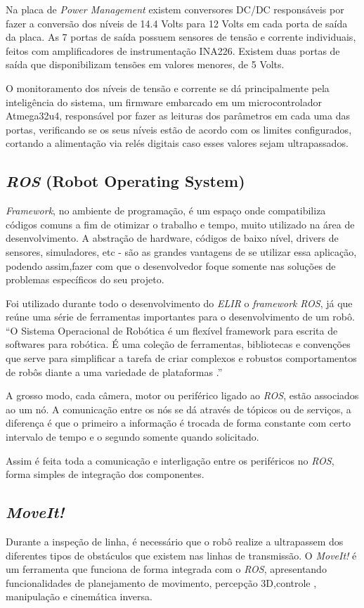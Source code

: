 Na placa de \textit{Power Management} existem conversores DC/DC responsáveis por fazer a conversão dos níveis de 14.4 Volts para 12 Volts em cada porta de saída da placa. As 7 portas de saída  possuem sensores de tensão e corrente individuais, feitos com amplificadores de instrumentação INA226. Existem duas portas de saída que disponibilizam tensões em valores menores, de 5 Volts. 

O monitoramento dos níveis de tensão e corrente se dá principalmente pela inteligência do sistema, um firmware embarcado em um microcontrolador Atmega32u4, responsável por fazer as leituras dos parâmetros em cada uma das portas, verificando se os seus níveis estão de acordo com os limites configurados, cortando a alimentação via relés digitais caso esses valores sejam ultrapassados.

\subsection{\textit{ROS} (Robot Operating System)}
\textit{Framework}, no ambiente de programação, é um espaço onde compatibiliza códigos comuns a fim de otimizar o trabalho e tempo, muito utilizado na área de desenvolvimento. A abstração de hardware, códigos de baixo nível, drivers de sensores, simuladores, etc - são as grandes vantagens de se utilizar essa aplicação, podendo assim,fazer com que o desenvolvedor foque somente nas soluções de problemas específicos do seu projeto.

Foi utilizado durante todo o desenvolvimento do \textit{ELIR} o \textit{framework} \textit{ROS}, já que reúne uma série de ferramentas importantes para o desenvolvimento de um robô.  “O Sistema Operacional de Robótica é um flexível framework para escrita de softwares para robótica. É uma coleção de ferramentas, bibliotecas e convenções que serve para simplificar a tarefa de criar complexos e robustos comportamentos de robôs diante a uma variedade de plataformas \cite{ros_site}.”

A grosso modo, cada câmera, motor ou periférico ligado ao \textit{ROS}, estão associados ao um nó. A comunicação entre os nós se dá através de tópicos ou de serviços, a diferença é que o primeiro a informação é trocada de forma constante com certo intervalo de tempo e o segundo somente quando solicitado.

Assim é feita toda a comunicação e interligação entre os periféricos no \textit{ROS}, forma simples de integração dos componentes.

\subsection{\textit{MoveIt!}}
Durante a inspeção de linha, é necessário que o robô realize a ultrapassem dos diferentes tipos de obstáculos que existem nas linhas de transmissão. O \textit{MoveIt!} é um ferramenta que funciona de forma integrada com o \textit{ROS}, apresentando funcionalidades de planejamento de movimento, percepção 3D,controle , manipulação e cinemática inversa. 


